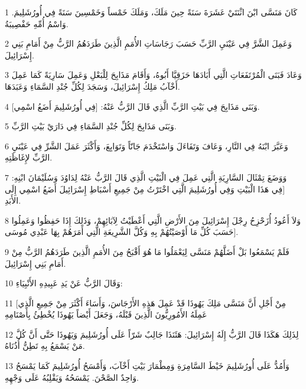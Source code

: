 \par 1 كَانَ مَنَسَّى ابْنَ اثْنَتَيْ عَشَرَةَ سَنَةً حِينَ مَلَكَ، وَمَلَكَ خَمْساً وَخَمْسِينَ سَنَةً فِي أُورُشَلِيمَ. وَاسْمُ أُمِّهِ حَفْصِيبَةُ.
\par 2 وَعَمِلَ الشَّرَّ فِي عَيْنَيِ الرَّبِّ حَسَبَ رَجَاسَاتِ الأُمَمِ الَّذِينَ طَرَدَهُمُ الرَّبُّ مِنْ أَمَامِ بَنِي إِسْرَائِيلَ.
\par 3 وَعَادَ فَبَنَى الْمُرْتَفَعَاتِ الَّتِي أَبَادَهَا حَزَقِيَّا أَبُوهُ، وَأَقَامَ مَذَابِحَ لِلْبَعْلِ وَعَمِلَ سَارِيَةً كَمَا عَمِلَ أَخْآبُ مَلِكُ إِسْرَائِيلَ، وَسَجَدَ لِكُلِّ جُنْدِ السَّمَاءِ وَعَبَدَهَا.
\par 4 وَبَنَى مَذَابِحَ فِي بَيْتِ الرَّبِّ الَّذِي قَالَ الرَّبُّ عَنْهُ: [فِي أُورُشَلِيمَ أَضَعُ اسْمِي].
\par 5 وَبَنَى مَذَابِحَ لِكُلِّ جُنْدِ السَّمَاءِ فِي دَارَيْ بَيْتِ الرَّبِّ.
\par 6 وَعَبَّرَ ابْنَهُ فِي النَّارِ، وَعَافَ وَتَفَاءَلَ وَاسْتَخْدَمَ جَانّاً وَتَوَابِعَ، وَأَكْثَرَ عَمَلَ الشَّرِّ فِي عَيْنَيِ الرَّبِّ لإِغَاظَتِهِ.
\par 7 وَوَضَعَ تِمْثَالَ السَّارِيَةِ الَّتِي عَمِلَ فِي الْبَيْتِ الَّذِي قَالَ الرَّبُّ عَنْهُ لِدَاوُدَ وَسُلَيْمَانَ ابْنِهِ: [فِي هَذَا الْبَيْتِ وَفِي أُورُشَلِيمَ الَّتِي اخْتَرْتُ مِنْ جَمِيعِ أَسْبَاطِ إِسْرَائِيلَ أَضَعُ اسْمِي إِلَى الأَبَدِ.
\par 8 وَلاَ أَعُودُ أُزَحْزِحُ رِجْلَ إِسْرَائِيلَ مِنَ الأَرْضِ الَّتِي أَعْطَيْتُ لِآبَائِهِمْ، وَذَلِكَ إِذَا حَفِظُوا وَعَمِلُوا حَسَبَ كُلِّ مَا أَوْصَيْتُهُمْ بِهِ وَكُلَّ الشَّرِيعَةِ الَّتِي أَمَرَهُمْ بِهَا عَبْدِي مُوسَى].
\par 9 فَلَمْ يَسْمَعُوا بَلْ أَضَلَّهُمْ مَنَسَّى لِيَعْمَلُوا مَا هُوَ أَقْبَحُ مِنَ الأُمَمِ الَّذِينَ طَرَدَهُمُ الرَّبُّ مِنْ أَمَامِ بَنِي إِسْرَائِيلَ.
\par 10 وَقَالَ الرَّبُّ عَنْ يَدِ عَبِيدِهِ الأَنْبِيَاءِ:
\par 11 [مِنْ أَجْلِ أَنَّ مَنَسَّى مَلِكَ يَهُوذَا قَدْ عَمِلَ هَذِهِ الأَرْجَاسَ، وَأَسَاءَ أَكْثَرَ مِنْ جَمِيعِ الَّذِي عَمِلَهُ الأَمُورِيُّونَ الَّذِينَ قَبْلَهُ، وَجَعَلَ أَيْضاً يَهُوذَا يُخْطِئُ بِأَصْنَامِهِ
\par 12 لِذَلِكَ هَكَذَا قَالَ الرَّبُّ إِلَهُ إِسْرَائِيلَ: هَئَنَذَا جَالِبٌ شَرّاً عَلَى أُورُشَلِيمَ وَيَهُوذَا حَتَّى أَنَّ كُلَّ مَنْ يَسْمَعُ بِهِ تَطِنُّ أُذُنَاهُ.
\par 13 وَأَمُدُّ عَلَى أُورُشَلِيمَ خَيْطَ السَّامِرَةِ وَمِطْمَارَ بَيْتِ أَخْآبَ، وَأَمْسَحُ أُورُشَلِيمَ كَمَا يَمْسَحُ وَاحِدٌ الصَّحْنَ. يَمْسَحُهُ وَيَقْلِبُهُ عَلَى وَجْهِهِ.
